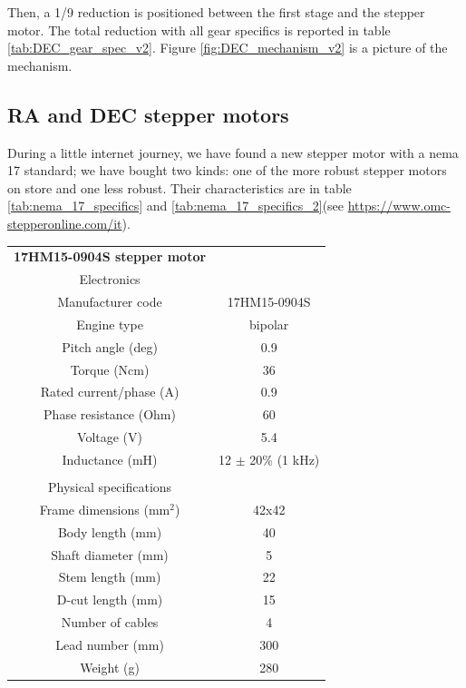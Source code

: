 \documentclass{article}
\begin{document}
\begin{multicols}{2}
\begin{minipage}
            \label{fig:DEC_mechanism_v2}
        \end{minipage}
        Then, a 1/9 reduction is positioned between the first stage and the stepper motor.
        The total reduction with all gear specifics is reported in table \ref{tab:DEC_gear_spec_v2}.
        Figure \ref{fig:DEC_mechanism_v2} is a picture of the mechanism.

        \subsection{RA and DEC stepper motors}
        During a little internet journey, we have found a new stepper motor with a nema 17 standard;
        we have bought two kinds: one of the more robust stepper motors on store and one less robust.
        Their characteristics are in table \ref{tab:nema_17_specifics} and \ref{tab:nema_17_specifics_2}(see \url{https://www.omc-stepperonline.com/it}).

        \begin{minipage}{0.5\textwidth}
            \centering
            \begin{tabular}{cc}
                \textbf{17HM15-0904S stepper motor}&\\
                Electronics&\\
                \hline
                Manufacturer code & 17HM15-0904S\\
                Engine type & bipolar\\
                Pitch angle (deg) & 0.9 \\
                Torque (Ncm)& 36\\
                Rated current/phase (A) & 0.9\\
                Phase resistance (Ohm)& 60\\
                Voltage (V)& 5.4\\
                Inductance (mH)& 12 \(\pm\) 20\% (1 kHz)\\
                 & \\
                Physical specifications&\\
                \hline
                Frame dimensions (mm\(^2\))& 42x42 \\
                Body length (mm)& 40 \\
                Shaft diameter (mm)& 5 \\
                Stem length (mm)& 22 \\
                D-cut length (mm)& 15 \\
                Number of cables & 4\\
                Lead number (mm)& 300 \\
                Weight (g) & 280\\
                \hline
            \end{tabular}
            \label{tab:nema_17_specifics}
        \end{minipage}


\end{multicols}
\end{document}

